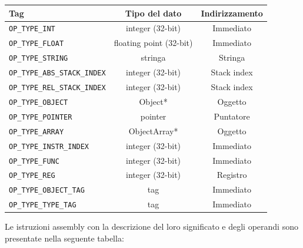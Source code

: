 \documentclass[a4paper, 11pt]{article}
\newcommand{\code}[1]{\scriptsize{\texttt{#1}}\normalsize}
\begin{document}
\begin{center}
\begin{tabular}{l|c|c}
\hline
\textbf{Tag} & \textbf{Tipo del dato} & \textbf{Indirizzamento}\\
\hline
  \code{OP\_TYPE\_INT} & integer (32-bit) & Immediato\\
  \code{OP\_TYPE\_FLOAT} & floating point (32-bit) & Immediato\\
   \code{OP\_TYPE\_STRING} & stringa & Stringa\\

   \code{OP\_TYPE\_ABS\_STACK\_INDEX} & integer (32-bit) & Stack index\\
   \code{OP\_TYPE\_REL\_STACK\_INDEX} & integer (32-bit) & Stack index\\

   \code{OP\_TYPE\_OBJECT} &  Object* & Oggetto\\
   \code{OP\_TYPE\_POINTER} & pointer & Puntatore\\
   \code{OP\_TYPE\_ARRAY} & ObjectArray* & Oggetto \\

   \code{OP\_TYPE\_INSTR\_INDEX} & integer (32-bit) & Immediato\\
   \code{OP\_TYPE\_FUNC} & integer (32-bit) & Immediato\\
   \code{OP\_TYPE\_REG} & integer (32-bit) & Registro\\

   \code{OP\_TYPE\_OBJECT\_TAG} & tag  & Immediato\\
   \code{OP\_TYPE\_TYPE\_TAG} & tag & Immediato\\
\hline
\end{tabular}
\end{center}

Le istruzioni assembly con la descrizione del loro significato e degli operandi sono presentate nella seguente tabella:
\end{document}
